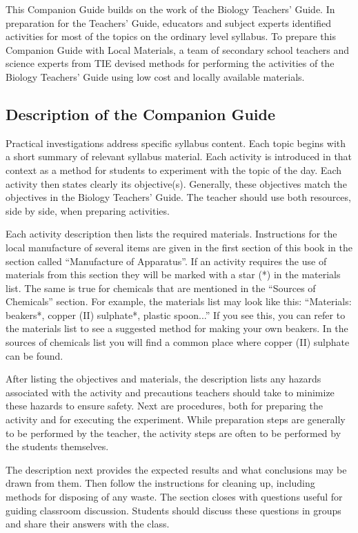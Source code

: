 This Companion Guide builds on the work of the Biology Teachers' Guide. In preparation for the Teachers' Guide, educators and subject experts identified activities for most of the topics on the ordinary level syllabus. To prepare this Companion Guide with Local Materials, a team of secondary school teachers and science experts from TIE devised methods for performing the activities of the Biology Teachers' Guide using low cost and locally available materials.

\subsection*{Description of the Companion Guide}

Practical investigations address specific syllabus content. Each topic begins with a short summary of relevant syllabus material. Each activity is introduced in that context as a method for students to experiment with the topic of the day. Each activity then states clearly its objective(s). Generally, these objectives match the objectives in the Biology Teachers' Guide. The teacher should use both resources, side by side, when preparing activities.

Each activity description then lists the required materials. Instructions for the local manufacture of several items are given in the first section of this book in the section called ``Manufacture of Apparatus''. If an activity requires the use of materials from this section they will be marked with a star (*) in the materials list. The same is true for chemicals that are mentioned in the ``Sources of Chemicals'' section. For example, the materials list may look like this:
``Materials: beakers*, copper (II) sulphate*, plastic spoon...''
If you see this, you can refer to the materials list to see a suggested method for making your own beakers. In the sources of chemicals list you will find a common place where copper (II) sulphate can be found. 

After listing the objectives and materials, the description lists any hazards associated with the activity and precautions teachers should take to minimize these hazards to ensure safety. Next are procedures, both for preparing the activity and for executing the experiment. While preparation steps are generally to be performed by the teacher, the activity steps are often to be performed by the students themselves.

The description next provides the expected results and what conclusions may be drawn from them. Then follow the instructions for cleaning up, including methods for disposing of any waste. The section closes with questions useful for guiding classroom discussion. Students should discuss these questions in groups and share their answers with the class.

